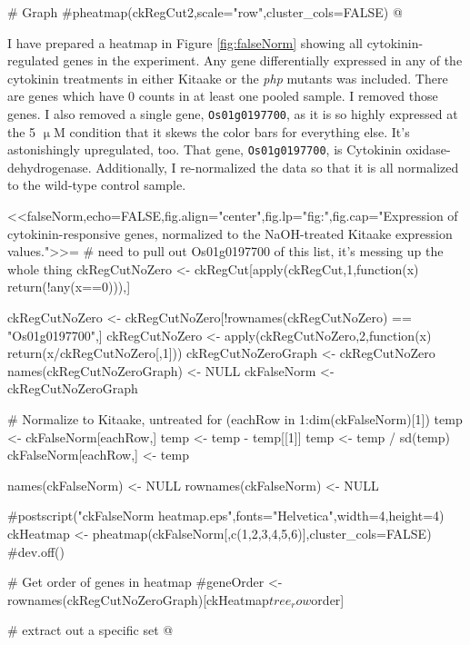 \documentclass{article}
\begin{document}
{{{{# Graph
#pheatmap(ckRegCut2,scale="row",cluster_cols=FALSE)
@

I have prepared a heatmap in Figure \ref{fig:falseNorm} showing all cytokinin-regulated genes in the experiment. Any gene differentially expressed in any of the cytokinin treatments in either Kitaake or the \textit{php} mutants was included.
There are  genes which have 0 counts in at least one pooled sample. I removed those genes. I also removed a single gene, \texttt{Os01g0197700}, as it is so highly expressed at the 5 $\upmu$M condition that it skews the color bars for everything else. It's astonishingly upregulated, too. That gene, \texttt{Os01g0197700}, is Cytokinin oxidase-dehydrogenase. Additionally, I re-normalized the data so that it is all normalized to the wild-type control sample.

<<falseNorm,echo=FALSE,fig.align="center",fig.lp="fig:",fig.cap="Expression of cytokinin-responsive genes, normalized to the NaOH-treated Kitaake expression values.">>=
# need to pull out Os01g0197700 of this list, it's messing up the whole thing
ckRegCutNoZero <- ckRegCut[apply(ckRegCut,1,function(x) return(!any(x==0))),]

ckRegCutNoZero <- ckRegCutNoZero[!rownames(ckRegCutNoZero) == "Os01g0197700",]
ckRegCutNoZero <- apply(ckRegCutNoZero,2,function(x) return(x/ckRegCutNoZero[,1]))
ckRegCutNoZeroGraph <- ckRegCutNoZero
names(ckRegCutNoZeroGraph) <- NULL
ckFalseNorm <- ckRegCutNoZeroGraph


# Normalize to Kitaake, untreated
for (eachRow in 1:dim(ckFalseNorm)[1]) {
	temp <- ckFalseNorm[eachRow,]
	temp <- temp - temp[[1]]
	temp <- temp / sd(temp)
	ckFalseNorm[eachRow,] <- temp
}

names(ckFalseNorm) <- NULL
rownames(ckFalseNorm) <- NULL

#postscript("ckFalseNorm heatmap.eps",fonts="Helvetica",width=4,height=4)
ckHeatmap <- pheatmap(ckFalseNorm[,c(1,2,3,4,5,6)],cluster_cols=FALSE)
#dev.off()

# Get order of genes in heatmap
#geneOrder <- rownames(ckRegCutNoZeroGraph)[ckHeatmap$tree_row$order]

# extract out a specific set
@


}}}}
\end{document}
